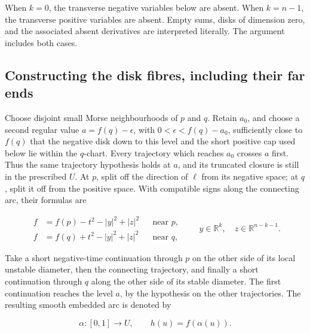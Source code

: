 When \(k=0\), the transverse negative variables below are absent. When \(k=n-1\), the transverse positive variables are absent. Empty sums, disks of dimension zero, and the associated absent derivatives are interpreted literally. The argument includes both cases.

\subsection{Constructing the disk fibres, including their far ends}
\label{courseIII:morse-cancellation-with-controlled-support:morse-cancellation-fibres}

\label{courseIII:morse-cancellation-with-controlled-support:section-3}

Choose disjoint small Morse neighbourhoods of \(p\) and \(q\). Retain \(a_0\), and choose a second regular value \(a=f(q)-\epsilon\), with \(0<\epsilon<f(q)-a_0\), sufficiently close to \(f(q)\) that the negative disk down to this level and the short positive cap used below lie within the \(q\)-chart. Every trajectory which reaches \(a_0\) crosses \(a\) first. Thus the same trajectory hypothesis holds at \(a\), and its truncated closure is still in the prescribed \(U\). At \(p\), split off the direction of \(\ell\) from its negative space; at \(q\), split it off from the positive space. With compatible signs along the connecting arc, their formulas are

\begin{equation}
\begin{aligned}
f&=f(p)-t^2-|y|^2+|z|^2&&\text{near }p,\\
f&=f(q)+t^2-|y|^2+|z|^2&&\text{near }q,
\end{aligned}
\qquad y\in\mathbb R^k,\quad z\in\mathbb R^{n-k-1}.
\label{courseIII:morse-cancellation-with-controlled-support:eq:3.1}
\end{equation}

Take a short negative-time continuation through \(p\) on the other side of its local unstable diameter, then the connecting trajectory, and finally a short continuation through \(q\) along the other side of its stable diameter. The first continuation reaches the level \(a\), by the hypothesis on the other trajectories. The resulting smooth embedded arc is denoted by

\begin{equation}
\alpha:[0,1]\longrightarrow U,
\qquad h(u)=f(\alpha(u)).
\label{courseIII:morse-cancellation-with-controlled-support:eq:3.2}
\end{equation}

